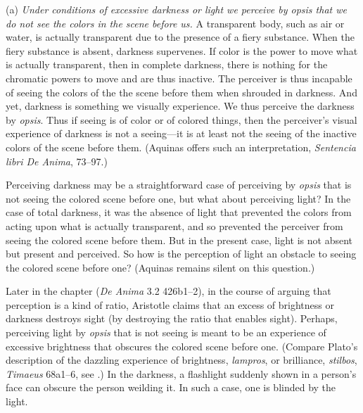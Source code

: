 (a) \emph{Under conditions of excessive darkness or light we perceive by \emph{opsis} that we do not see the colors in the scene before us.} A transparent body, such as air or water, is actually transparent due to the presence of a fiery substance. When the fiery substance is absent, darkness supervenes. If color is the power to move what is actually transparent, then in complete darkness, there is nothing for the chromatic powers to move and are thus inactive. The perceiver is thus incapable of seeing the colors of the the scene before them when shrouded in darkness. And yet, darkness is something we visually experience. We thus perceive the darkness by \emph{opsis}. Thus if seeing is of color or of colored things, then the perceiver's visual experience of darkness is not a seeing—it is at least not the seeing of the inactive colors of the scene before them. (Aquinas offers such an interpretation, \emph{Sentencia libri De Anima}, 73–97.)

Perceiving darkness may be a straightforward case of perceiving by \emph{opsis} that is not seeing the colored scene before one, but what about perceiving light? In the case of total darkness, it was the absence of light that prevented the colors from acting upon what is actually transparent, and so prevented the perceiver from seeing the colored scene before them. But in the present case, light is not absent but present and perceived. So how is the perception of light an obstacle to seeing the colored scene before one? (Aquinas remains silent on this question.)


Later in the chapter (\emph{De Anima} 3.2 426b1–2), in the course of arguing that perception is a kind of ratio, Aristotle claims that an excess of brightness or darkness destroys sight (by destroying the ratio that enables sight). Perhaps, perceiving light by \emph{opsis} that is not seeing is meant to be an experience of excessive brightness that obscures the colored scene before one. (Compare Plato's description of the dazzling experience of brightness, \emph{lampros}, or brilliance, \emph{stilbos}, \emph{Timaeus} 68a1–6, see \citealt[72–7]{Kalderon:2022kl}.) In the darkness, a flashlight suddenly shown in a person's face can obscure the person weilding it. In such a case, one is blinded by the light.

